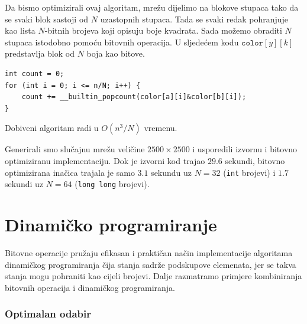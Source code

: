 Da bismo optimizirali ovaj algoritam, mrežu dijelimo na blokove
stupaca tako da se svaki blok sastoji od $N$
uzastopnih stupaca. Tada se svaki redak pohranjuje kao
lista $N$-bitnih brojeva koji opisuju boje
kvadrata. Sada možemo obraditi $N$ stupaca istodobno
pomoću bitovnih operacija. U sljedećem kodu
$\texttt{color}[y][k]$ predstavlja
blok od $N$ boja kao bitove.
\begin{lstlisting}
int count = 0;
for (int i = 0; i <= n/N; i++) {
    count += __builtin_popcount(color[a][i]&color[b][i]);
}
\end{lstlisting}
Dobiveni algoritam radi u $O(n^3/N)$ vremenu.

Generirali smo slučajnu mrežu veličine $2500 \times 2500$
i usporedili izvornu i bitovno optimiziranu implementaciju.
Dok je izvorni kod trajao $29.6$ sekundi,
bitovno optimizirana inačica trajala je samo $3.1$ sekundu
uz $N=32$ (\texttt{int} brojevi) i $1.7$ sekundi
uz $N=64$ (\texttt{long long} brojevi).

\section{Dinamičko programiranje}

Bitovne operacije pružaju efikasan i praktičan
način implementacije algoritama dinamičkog programiranja
čija stanja sadrže podskupove elemenata,
jer se takva stanja mogu pohraniti kao cijeli brojevi.
Dalje razmatramo primjere kombiniranja
bitovnih operacija i dinamičkog programiranja.

\subsubsection{Optimalan odabir}

